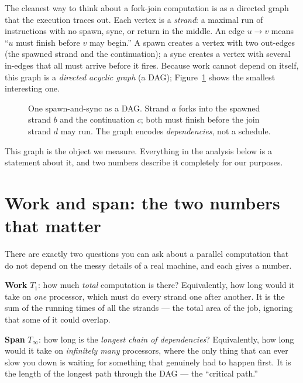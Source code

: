 The cleanest way to think about a fork-join computation is as a directed graph
that the execution traces out. Each vertex is a \emph{strand}: a maximal run of
instructions with no spawn, sync, or return in the middle. An edge $u \to v$ means
``$u$ must finish before $v$ may begin.'' A spawn creates a vertex with two
out-edges (the spawned strand and the continuation); a sync creates a vertex with
several in-edges that all must arrive before it fires. Because work cannot depend
on itself, this graph is a \emph{directed acyclic graph} (a DAG);
Figure~\ref{ch35:fork-join-dag} shows the smallest interesting one.

\begin{figure}[h]
\centering
{}
\caption{One spawn-and-sync as a DAG. Strand $a$ forks into the spawned strand
$b$ and the continuation $c$; both must finish before the join strand $d$ may
run. The graph encodes \emph{dependencies}, not a schedule.}
\label{ch35:fork-join-dag}
\end{figure}

This graph is the object we measure. Everything in the analysis below is a
statement about it, and two numbers describe it completely for our purposes.

\section{Work and span: the two numbers that matter}

There are exactly two questions you can
ask about a parallel computation that do not depend on the messy details of a
real machine, and each gives a number.

\begin{intuitionbox}
\textbf{Work} $T_1$: how much \emph{total} computation is there? Equivalently,
how long would it take on \emph{one} processor, which must do every strand
one after another. It is the sum of the running times of all the strands --- the
total area of the job, ignoring that some of it could overlap.

\textbf{Span} $T_\infty$: how long is the \emph{longest chain of dependencies}?
Equivalently, how long would it take on \emph{infinitely many} processors, where
the only thing that can ever slow you down is waiting for something that genuinely
had to happen first. It is the length of the longest path through the DAG --- the
``critical path.''
\end{intuitionbox}

